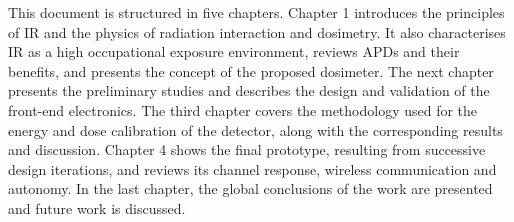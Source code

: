 This document is structured in five chapters. Chapter 1 introduces the principles of IR and
the physics of radiation interaction and dosimetry. It also characterises IR as a high
occupational exposure environment, reviews APDs and their benefits, and presents the concept
of the proposed dosimeter. The next chapter presents the preliminary studies and describes
the design and validation of the front-end electronics. The third chapter covers the
methodology used for the energy and dose calibration of the detector, along with the
corresponding results and discussion. Chapter 4 shows the final prototype, resulting from
successive design iterations, and reviews its channel response, wireless communication and
autonomy. In the last chapter, the global conclusions of the work are presented and future
work is discussed.